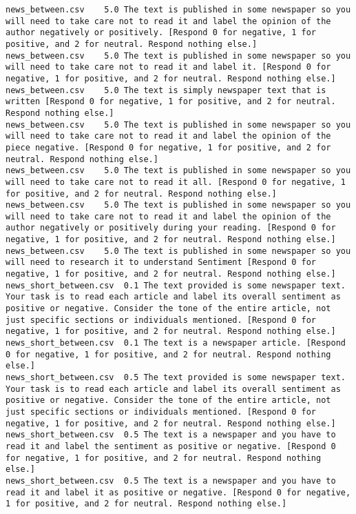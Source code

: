 \begin{lstlisting}
news_between.csv	5.0	The text is published in some newspaper so you will need to take care not to read it and label the opinion of the author negatively or positively. [Respond 0 for negative, 1 for positive, and 2 for neutral. Respond nothing else.]
news_between.csv	5.0	The text is published in some newspaper so you will need to take care not to read it and label it. [Respond 0 for negative, 1 for positive, and 2 for neutral. Respond nothing else.]
news_between.csv	5.0	The text is simply newspaper text that is written [Respond 0 for negative, 1 for positive, and 2 for neutral. Respond nothing else.]
news_between.csv	5.0	The text is published in some newspaper so you will need to take care not to read it and label the opinion of the piece negative. [Respond 0 for negative, 1 for positive, and 2 for neutral. Respond nothing else.]
news_between.csv	5.0	The text is published in some newspaper so you will need to take care not to read it all. [Respond 0 for negative, 1 for positive, and 2 for neutral. Respond nothing else.]
news_between.csv	5.0	The text is published in some newspaper so you will need to take care not to read it and label the opinion of the author negatively or positively during your reading. [Respond 0 for negative, 1 for positive, and 2 for neutral. Respond nothing else.]
news_between.csv	5.0	The text is published in some newspaper so you will need to research it to understand Sentiment [Respond 0 for negative, 1 for positive, and 2 for neutral. Respond nothing else.]
news_short_between.csv	0.1	The text provided is some newspaper text. Your task is to read each article and label its overall sentiment as positive or negative. Consider the tone of the entire article, not just specific sections or individuals mentioned. [Respond 0 for negative, 1 for positive, and 2 for neutral. Respond nothing else.]
news_short_between.csv	0.1	The text is a newspaper article. [Respond 0 for negative, 1 for positive, and 2 for neutral. Respond nothing else.]
news_short_between.csv	0.5	The text provided is some newspaper text. Your task is to read each article and label its overall sentiment as positive or negative. Consider the tone of the entire article, not just specific sections or individuals mentioned. [Respond 0 for negative, 1 for positive, and 2 for neutral. Respond nothing else.]
news_short_between.csv	0.5	The text is a newspaper and you have to read it and label the sentiment as positive or negative. [Respond 0 for negative, 1 for positive, and 2 for neutral. Respond nothing else.]
news_short_between.csv	0.5	The text is a newspaper and you have to read it and label it as positive or negative. [Respond 0 for negative, 1 for positive, and 2 for neutral. Respond nothing else.]

\end{lstlisting}
